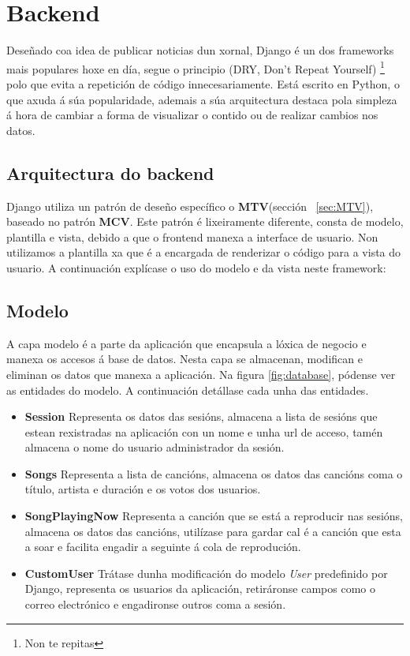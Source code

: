 \section{Backend}
Deseñado coa idea de publicar noticias dun xornal, Django é un dos frameworks mais populares hoxe en día, segue o principio (DRY, Don't Repeat Yourself) \footnote{Non te repitas} polo que evita a repetición de código innecesariamente. Está escrito en Python, o que axuda á súa popularidade, ademais a súa arquitectura destaca pola simpleza á hora de cambiar a forma de visualizar o contido ou de realizar cambios nos datos.

\subsection{Arquitectura do backend}
Django utiliza un patrón de deseño específico o \textbf{MTV}(sección ~\ref{sec:MTV}), baseado no patrón \textbf{MCV}. Este patrón é lixeiramente diferente, consta de modelo, plantilla e vista, debido a que o frontend manexa a interface de usuario. Non utilizamos a plantilla xa que é a encargada de renderizar o código para a vista do usuario. A continuación explícase o uso do modelo e da vista neste framework:

\subsection{Modelo}
\label{sec:modelo}
A capa modelo é a parte da aplicación que encapsula a lóxica de negocio e manexa os accesos á base de datos. Nesta capa se almacenan, modifican e eliminan os datos que manexa a aplicación. Na figura \ref{fig:database}, pódense ver as entidades do modelo. A continuación detállase cada unha das entidades.

\begin{itemize}
	\item \textbf{Session}\smallbreak
		Representa os datos das sesións, almacena a lista de sesións que estean rexistradas na aplicación con un nome e unha url de acceso, tamén almacena o nome do usuario administrador da sesión.

	\item \textbf{Songs}\smallbreak
		Representa a lista de cancións, almacena os datos das cancións coma o título, artista e duración e os votos dos usuarios.

	\item \textbf{SongPlayingNow}\smallbreak
		Representa a canción que se está a reproducir nas sesións, almacena os datos das cancións, utilízase para gardar cal é a canción que esta a soar e facilita engadir a seguinte á cola de reprodución.

	\item \textbf{CustomUser}\smallbreak
		Trátase dunha modificación do modelo \textit{User} predefinido por Django, representa os usuarios da aplicación, retiráronse campos como o correo electrónico e engadironse outros coma a sesión.
\end{itemize}


